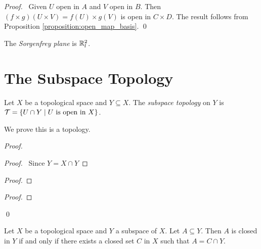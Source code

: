\begin{proof}
    \pf\ Given $U$ open in $A$ and $V$ open in $B$. Then $(f \times g)(U \times V) = f(U) \times g(V)$ is open in $C \times D$.
    The result follows from Proposition \ref{proposition:open_map_basis}. \qed
\end{proof}

\begin{definition}
    The \emph{Sorgenfrey plane} is $\mathbb{R}_l^2$.    
\end{definition}

\section{The Subspace Topology}

\begin{definition}
    Let $X$ be a topological space and $Y \subseteq X$. The \emph{subspace topology} on $Y$ is
    $\mathcal{T} = \{ U \cap Y \mid U \text{ is open in } X \}$.
\end{definition}

We prove this is a topology.

\begin{proof}
    \pf
    \begin{proof}
        \pf\ Since $Y = X \cap Y$
    \end{proof}
    \begin{proof}
    \end{proof}
    \begin{proof}
    \end{proof}
    \qed
\end{proof}

\begin{theorem}
    \label{theorem:closed}
    Let $X$ be a topological space and $Y$ a subspace of $X$. Let $A \subseteq Y$. Then $A$ is closed in $Y$
    if and only if there exists a closed set $C$ in $X$ such that $A = C \cap Y$.
\end{theorem}

